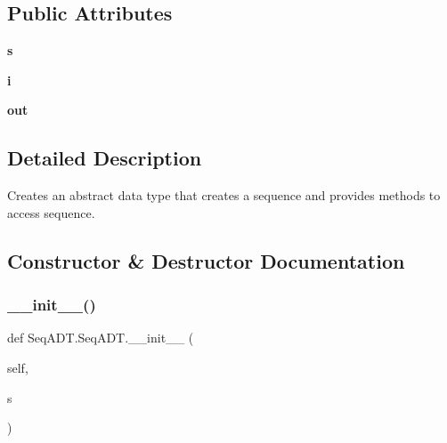 \subsection*{Public Attributes}
\begin{DoxyCompactItemize}
\item 
\mbox{\label{class_seq_a_d_t_1_1_seq_a_d_t_a1c751be49f197faecbd36352484be18d}} 
{\bfseries s}
\item 
\mbox{\label{class_seq_a_d_t_1_1_seq_a_d_t_a9c8c61691d99a130acbfd6f4c50e3ee0}} 
{\bfseries i}
\item 
\mbox{\label{class_seq_a_d_t_1_1_seq_a_d_t_ad37e0e1d6faab8f674532dcbccb31384}} 
{\bfseries out}
\end{DoxyCompactItemize}


\subsection{Detailed Description}
Creates an abstract data type that creates a sequence and provides methods to access sequence. 



\subsection{Constructor \& Destructor Documentation}
\mbox{\label{class_seq_a_d_t_1_1_seq_a_d_t_a274f6f35c4d7221955ff721ab88b12e1}} 
\subsubsection{\texorpdfstring{\+\_\+\+\_\+init\+\_\+\+\_\+()}{\_\_init\_\_()}}
{\footnotesize\ttfamily def Seq\+A\+D\+T.\+Seq\+A\+D\+T.\+\_\+\+\_\+init\+\_\+\+\_\+ (\begin{DoxyParamCaption}\item[{}]{self,  }\item[{}]{s }\end{DoxyParamCaption})}



